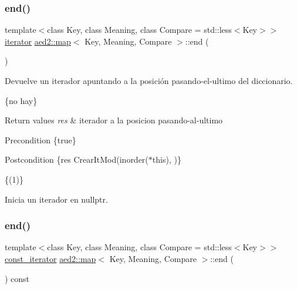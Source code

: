\subsubsection{\texorpdfstring{end()}{end()}\hspace{0.1cm}{\footnotesize\ttfamily [1/2]}}
{\footnotesize\ttfamily template$<$class Key, class Meaning, class Compare = std\+::less$<$\+Key$>$$>$ \\
\hyperlink{classaed2_1_1map_1_1iterator}{iterator} \hyperlink{classaed2_1_1map}{aed2\+::map}$<$ Key, Meaning, Compare $>$\+::end (\begin{DoxyParamCaption}{ }\end{DoxyParamCaption})\hspace{0.3cm}{\ttfamily [inline]}}



Devuelve un iterador apuntando a la posición pasando-\/el-\/ultimo del diccionario. 

\{no hay\}


\begin{DoxyRetVals}{Return values}
{\em res} & iterador a la posicion pasando-\/al-\/ultimo\\
\hline
\end{DoxyRetVals}
\begin{DoxyPrecond}{Precondition}
\{true\} 
\end{DoxyPrecond}
\begin{DoxyPostcond}{Postcondition}
\{res  Crear\+It\+Mod(inorder($\ast$this),  )\}
\end{DoxyPostcond}
\{(1)\}

Inicia un iterador en nullptr. \mbox{\label{classaed2_1_1map_a91e7cad1a638c55659c169d5574cd5d7}} 
\subsubsection{\texorpdfstring{end()}{end()}\hspace{0.1cm}{\footnotesize\ttfamily [2/2]}}
{\footnotesize\ttfamily template$<$class Key, class Meaning, class Compare = std\+::less$<$\+Key$>$$>$ \\
\hyperlink{classaed2_1_1map_1_1const__iterator}{const\+\_\+iterator} \hyperlink{classaed2_1_1map}{aed2\+::map}$<$ Key, Meaning, Compare $>$\+::end (\begin{DoxyParamCaption}{ }\end{DoxyParamCaption}) const\hspace{0.3cm}{\ttfamily [inline]}}

